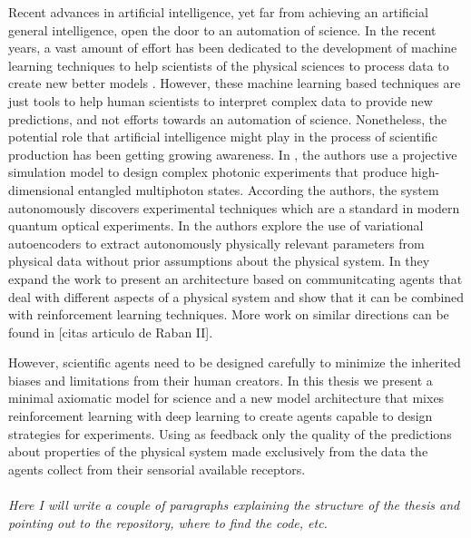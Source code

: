 \documentclass[11pt,a4paper,twoside]{report}
\newcommand{\+}{\textnormal{+} }
\theoremstyle{definition}
\numberwithin{equation}{chapter}
\begin{document}
Recent advances in artificial intelligence, yet far from achieving an artificial
general intelligence, open the door to an automation of science. In the recent
years, a vast amount of effort has been dedicated to the development of machine
learning techniques to help scientists of the physical sciences to process data
to create new better models \cite{Carleo_2019}. However, these machine learning
based techniques are just tools to help human scientists to interpret complex
data to provide new predictions, and not efforts towards an automation of
science. Nonetheless, the potential role that artificial intelligence might play
in the process of scientific production has been getting growing awareness. In
\cite{Melnikov_2018}, the authors use a projective simulation model to design
complex photonic experiments that produce high-dimensional entangled multiphoton
states. According the authors, the system autonomously discovers experimental
techniques which are a standard in modern quantum optical experiments. In
\cite{iten2020discovering} the authors explore the use of variational
autoencoders to extract autonomously physically relevant parameters from
physical data without prior assumptions about the physical system. In
\cite{nautrup2020operationally} they expand the work to present an architecture
based on communitcating agents that deal with different aspects of a physical
system and show that it can be combined with reinforcement learning techniques.
More work on similar directions can be found in [citas articulo de Raban II].
\par
However, scientific agents need to be designed carefully to minimize the
inherited biases and limitations from their human creators. In this thesis we
present a minimal axiomatic model for science and a new model architecture that
mixes reinforcement learning with deep learning to create agents capable to
design strategies for experiments. Using as feedback only the quality of the
predictions about properties of the physical system made exclusively from the
data the agents collect from their sensorial available receptors. 
\\
\\
\textit{Here I will write a couple of paragraphs explaining the structure of the 
thesis and pointing out to the repository, where to find the code, etc.}

\vspace{12mm}


\end{document}
